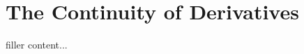 \documentclass[../../templates/section]{subfiles}
\begin{document}
\section{The Continuity of Derivatives}\label{sec:the-continuity-of-derivatives}

filler content...
\end{document}
